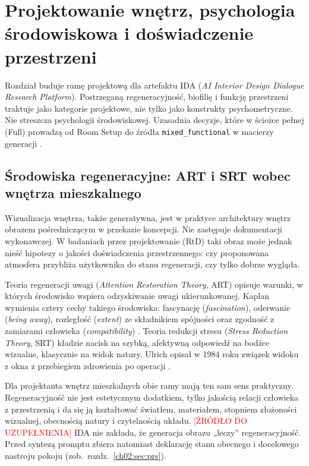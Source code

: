 \chapter{Projektowanie wnętrz, psychologia środowiskowa i doświadczenie przestrzeni}
\label{ch02:top}

Rozdział buduje ramę projektową dla artefaktu IDA (\emph{AI Interior Design Dialogue Research Platform}). Postrzeganą regeneracyjność, biofilię i funkcję przestrzeni traktuje jako kategorie projektowe, nie tylko jako konstrukty psychometryczne.
Nie streszcza psychologii środowiskowej. Uzasadnia decyzje, które w ścieżce pełnej (Full) prowadzą od Room Setup do źródła \texttt{mixed\_functional} w macierzy generacji \parencite{idaPlatform2026}.

\section{Środowiska regeneracyjne: ART i SRT wobec wnętrza mieszkalnego}
\label{ch02:sec:art}

Wizualizacja wnętrza, także generatywna, jest w praktyce architektury wnętrz obrazem pośredniczącym w przekazie koncepcji. Nie zastępuje dokumentacji wykonawczej.
W badaniach przez projektowanie (RtD) taki obraz może jednak nieść hipotezy o jakości doświadczenia przestrzennego: czy proponowana atmosfera przybliża użytkownika do stanu regeneracji, czy tylko dobrze wygląda.

Teoria regeneracji uwagi (\emph{Attention Restoration Theory}, ART) opisuje warunki, w których środowisko wspiera odzyskiwanie uwagi ukierunkowanej. Kaplan wymienia cztery cechy takiego środowiska: fascynację (\emph{fascination}), oderwanie (\emph{being away}), rozległość (\emph{extent}) ze składnikiem spójności oraz zgodność z zamiarami człowieka (\emph{compatibility}) \parencite{kaplan1995restorative}.
Teoria redukcji stresu (\emph{Stress Reduction Theory}, SRT) kładzie nacisk na szybką, afektywną odpowiedź na bodźce wizualne, klasycznie na widok natury. Ulrich opisał w 1984 roku związek widoku z okna z przebiegiem zdrowienia po operacji \parencite{ulrich1984window}.

Dla projektanta wnętrz mieszkalnych obie ramy mają ten sam sens praktyczny. Regeneracyjność nie jest estetycznym dodatkiem, tylko jakością relacji człowieka z przestrzenią i da się ją kształtować światłem, materiałem, stopniem złożoności wizualnej, obecnością natury i czytelnością układu. \textcolor{red}{[ŹRÓDŁO DO UZUPEŁNIENIA]}
IDA nie zakłada, że generacja obrazu „leczy” regeneracyjność. Przed syntezą promptu zbiera natomiast deklarację stanu obecnego i docelowego nastroju pokoju (zob.\ rozdz.~\ref{ch02:sec:prs}).

